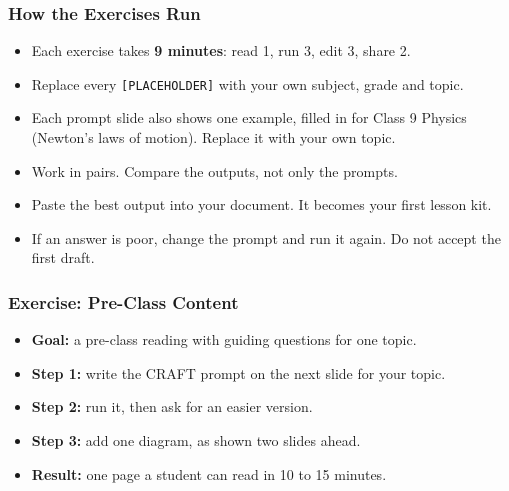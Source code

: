 \begin{frame}[fragile]\frametitle{How the Exercises Run}
\begin{itemize}
\item Each exercise takes \textbf{9 minutes}: read 1, run 3, edit 3, share 2.
\item Replace every \texttt{[PLACEHOLDER]} with your own subject, grade and topic.
\item Each prompt slide also shows one example, filled in for Class 9 Physics (Newton's laws of motion). Replace it with your own topic.
\item Work in pairs. Compare the outputs, not only the prompts.
\item Paste the best output into your document. It becomes your first lesson kit.
\item If an answer is poor, change the prompt and run it again. Do not accept the first draft.
\end{itemize}
\end{frame}

\begin{frame}[fragile]\frametitle{Exercise: Pre-Class Content}
\begin{itemize}
\item \textbf{Goal:} a pre-class reading with guiding questions for one topic.
\item \textbf{Step 1:} write the CRAFT prompt on the next slide for your topic.
\item \textbf{Step 2:} run it, then ask for an easier version.
\item \textbf{Step 3:} add one diagram, as shown two slides ahead.
\item \textbf{Result:} one page a student can read in 10 to 15 minutes.
\end{itemize}
\end{frame}

